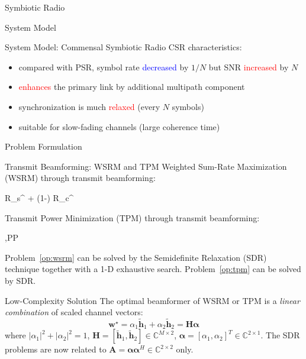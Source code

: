 \documentclass[9pt]{beamer}
\begin{document}
\begin{section}{Symbiotic Radio}
\begin{subsection}{System Model}
\begin{frame}{System Model: Commensal Symbiotic Radio}
				CSR characteristics:
				\begin{itemize}
					\item compared with PSR, symbol rate \textcolor{blue}{decreased} by $1/N$ but SNR \textcolor{red}{increased} by $N$
					\item \textcolor{red}{enhances} the primary link by additional multipath component
					\item synchronization is much \textcolor{red}{relaxed} (every $N$ symbols)
					\item suitable for slow-fading channels (large coherence time)
				\end{itemize}
			\end{frame}
		\end{subsection}

		\begin{subsection}{Problem Formulation}
			\begin{frame}{Transmit Beamforming: WSRM and TPM}
				Weighted Sum-Rate Maximization (WSRM) through transmit beamforming:
				\begin{maxi!}
					{}{\rho R_{s}^{} + (1-\rho) R_{c}^{}}{\label{op:wsrm}}{\label{ob:wsrm}}
					\label{co:wsrm_power}
					\label{co:wsrm_weight}
				\end{maxi!}
				Transmit Power Minimization (TPM) through transmit beamforming:
				\begin{mini!}
					{,P}{P}{\label{op:tpm}}{\label{ob:tpm}}
					\label{co:tpm_primary}
					\label{co:tpm_secondary}
					\label{co:tpm_power}
				\end{mini!}

				Problem~\ref{op:wsrm} can be solved by the Semidefinite Relaxation (SDR) technique together with a 1-D exhaustive search. Problem~\ref{op:tpm} can be solved by SDR.
			\end{frame}

			\begin{frame}{Low-Complexity Solution}
				The optimal beamformer of WSRM or TPM is a \textit{linear combination} of scaled channel vectors:
				\begin{equation}
					\boldsymbol{w}^{\star}=\alpha_1 \tilde{\boldsymbol{h}}_1 + \alpha_2 \tilde{\boldsymbol{h}}_2=\boldsymbol{H}\boldsymbol{\alpha}
				\end{equation}
				where $\lvert{\alpha_1}\rvert^2+\lvert{\alpha_2}\rvert^2=1$, $\boldsymbol{H}=[\tilde{\boldsymbol{h}}_1,\tilde{\boldsymbol{h}}_2] \in \mathbb{C}^{M \times 2}$, $\boldsymbol{\alpha}=[\alpha_1,\alpha_2]^T \in \mathbb{C}^{2 \times 1}$. The SDR problems are now related to $\boldsymbol{A}=\boldsymbol{\alpha}\boldsymbol{\alpha}^H \in \mathbb{C}^{2 \times 2}$ only.


\end{frame}
\end{subsection}
\end{section}
\end{document}
